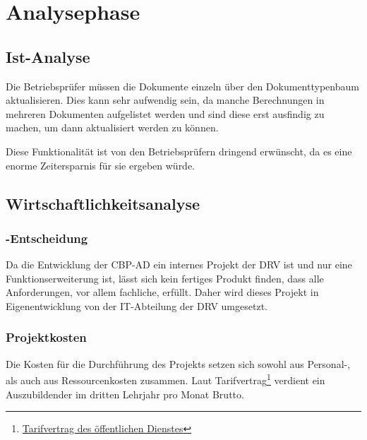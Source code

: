 

\section{Analysephase} 
\label{sec:Analysephase}


\subsection{Ist-Analyse} 
\label{sec:IstAnalyse}

Die Betriebsprüfer müssen die Dokumente einzeln über den Dokumenttypenbaum aktualisieren. Dies kann sehr aufwendig sein, da manche Berechnungen in mehreren Dokumenten aufgelistet werden und sind diese erst ausfindig zu machen, um dann aktualisiert werden zu können.

Diese Funktionalität ist von den Betriebsprüfern dringend erwünscht, da es eine enorme Zeitersparnis für sie ergeben würde.
\subsection{Wirtschaftlichkeitsanalyse}
\label{sec:Wirtschaftlichkeitsanalyse}

\subsubsection{-Entscheidung}
\label{sec:MakeOrBuyEntscheidung}

Da die Entwicklung der \acs{CBP-AD} ein internes Projekt der \acs{DRV} ist und nur eine Funktionserweiterung ist, lässt sich kein fertiges Produkt finden, dass alle Anforderungen, vor allem fachliche, erfüllt. Daher wird dieses Projekt in Eigenentwicklung von der IT-Abteilung der \acs{DRV} umgesetzt.

\subsubsection{Projektkosten}
\label{sec:Projektkosten}

Die Kosten für die Durchführung des Projekts setzen sich sowohl aus Personal-, als auch aus Ressourcenkosten zusammen.
Laut Tarifvertrag\footnote{\href{http://www.oeffentlichen-dienst.de/auszubildende/25-tarifvertrag-fuer-den-auszubildende/90-tvaoed-besonderer-teil-bbig.html}{Tarifvertrag des öffentlichen Dienstes}} verdient ein Auszubildender im dritten Lehrjahr pro Monat  Brutto. 

